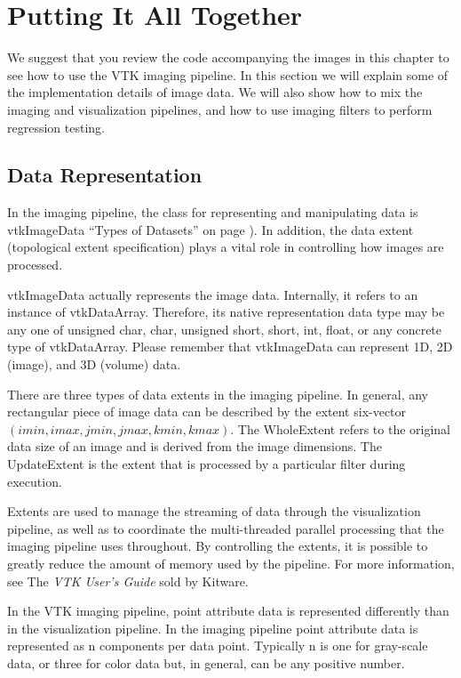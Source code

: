 \section{Putting It All Together}
\label{sec:chap10.putting_it_all_together}

We suggest that you review the code accompanying the images in this chapter to see how to use the VTK imaging pipeline. In this section we will explain some of the implementation details of image data. We will also show how to mix the imaging and visualization pipelines, and how to use imaging filters to perform regression testing.

\subsection{Data Representation}

In the imaging pipeline, the class for representing and manipulating data is vtkImageData ``Types of Datasets'' on page \pageref{sec:types_of_datasets}). In addition, the data extent (topological extent specification) plays a vital role in controlling how images are processed.

vtkImageData actually represents the image data. Internally, it refers to an instance of vtkDataArray. Therefore, its native representation data type may be any one of unsigned char, char, unsigned short, short, int, float, or any concrete type of vtkDataArray. Please remember that vtkImageData can represent 1D, 2D (image), and 3D (volume) data.

There are three types of data extents in the imaging pipeline. In general, any rectangular piece of image data can be described by the extent six-vector $(imin,imax, jmin,jmax, kmin,kmax)$. The WholeExtent refers to the original data size of an image and is derived from the image dimensions. The UpdateExtent is the extent that is processed by a particular filter during execution.

Extents are used to manage the streaming of data through the visualization pipeline, as well as to coordinate the multi-threaded parallel processing that the imaging pipeline uses throughout. By controlling the extents, it is possible to greatly reduce the amount of memory used by the pipeline. For more information, see The \emph{VTK User's Guide} sold by Kitware.

In the VTK imaging pipeline, point attribute data is represented differently than in the visualization pipeline. In the imaging pipeline point attribute data is represented as n components per data point. Typically n is one for gray-scale data, or three for color data but, in general, can be any positive number.

